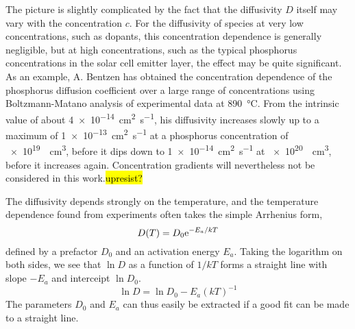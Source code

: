 \documentclass[11pt,bibliography=totoc,index=totoc]{scrbook}   %
\newcommand{\comment}[1]{\hl{#1}}
\begin{document}
The picture is slightly complicated by the fact that the diffusivity $D$ itself may vary with the concentration $c$.
For the diffusivity of species at very low concentrations, such as dopants, this concentration dependence is generally negligible, but at high concentrations, such as the typical phosphorus concentrations in the solar cell emitter layer, the effect may be quite significant.
As an example, A. Bentzen has obtained the concentration dependence of the phosphorus diffusion coefficient over a large range of concentrations using Boltzmann-Matano analysis of experimental data at \SI{890}{\celsius}. 
From the intrinsic value of about \SI{4e-14}{\centi\metre\squared\per\second}, his diffusivity increases slowly up to a maximum of \SI{1e-13}{\centi\metre\squared\per\second} at a phosphorus concentration of \SI{e19}{\per\centi\metre\cubed}, before it dips down to \SI{1e-14}{\centi\metre\squared\per\second} at \SI{e20}{\per\centi\metre\cubed}, before it increases again.\cite{Bentzen:2006} Concentration gradients will nevertheless not be considered in this work.\comment{upresist?}

The diffusivity depends strongly on the temperature, and the temperature dependence found from experiments often takes the simple Arrhenius form,
\begin{equation}
  D(T) = D_0 \mathrm{e}^{-E_a/kT}
\end{equation}
defined by a prefactor $D_0$ and an activation energy $E_a$. 
Taking the logarithm on both sides, we see that $\ln D$ as a function of $1/kT$ forms a straight line with slope $-E_a$ and interceipt $\ln D_0$. 
\begin{equation}
  \ln D = \ln D_0 - E_a (kT)^{-1}
\end{equation}
The parameters $D_0$ and $E_a$ can thus easily be extracted if a good fit can be made to a straight line.


\end{document}
